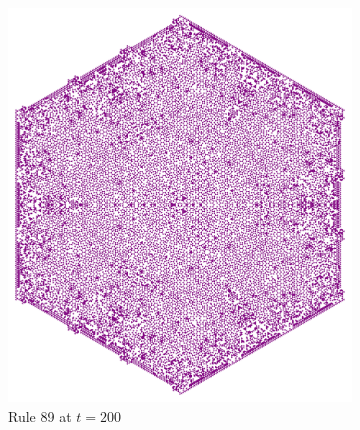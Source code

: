 \documentclass{article}
\begin{document}
\begin{figure}[H]
    \centering
    \begin{subfigure}[b]{0.45\textwidth}
        \centering
        \includegraphics[width=\textwidth]{graphics/behavior/beauty/rule-89-time-200-OneAlive.pdf}
        \caption{Rule 89 at $t=200$}
        \label{fig:rule-89-time-200-OneAlive}
    \end{subfigure}
    \begin{subfigure}[b]{0.45\textwidth}
        \centering
\end{subfigure}
\end{figure}
\end{document}
